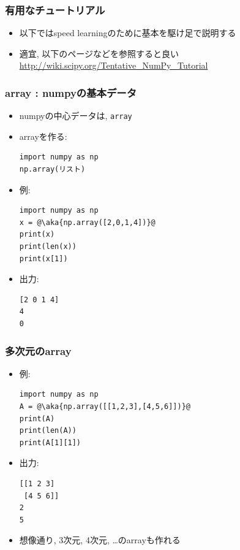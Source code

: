 \documentclass[10pt,dvipdfmx]{beamer}
\newcommand{\aka}[1]{{\color{red}#1}}
\begin{document}
\begin{frame}[fragile]
\frametitle{有用なチュートリアル}
\begin{itemize}
\item 以下ではspeed learningのために基本を駆け足で説明する
\item 適宜, 以下のページなどを参照すると良い
\url{http://wiki.scipy.org/Tentative_NumPy_Tutorial}
\end{itemize}

\end{frame}

\begin{frame}[fragile]
\frametitle{array : numpyの基本データ}
\begin{itemize}
\item numpyの中心データは, {\tt array}
\item arrayを作る:
\begin{lstlisting}
import numpy as np
np.array(リスト)
\end{lstlisting}
\item 例:
\begin{lstlisting}
import numpy as np
x = @\aka{np.array([2,0,1,4])}@
print(x)
print(len(x))
print(x[1])
\end{lstlisting}

\item 出力:
\begin{lstlisting}
[2 0 1 4]
4
0
\end{lstlisting}
\end{itemize}
\end{frame}


\begin{frame}[fragile]
\frametitle{多次元のarray}
\begin{itemize}
\item 例:
\begin{lstlisting}
import numpy as np
A = @\aka{np.array([[1,2,3],[4,5,6]])}@
print(A)
print(len(A))
print(A[1][1])
\end{lstlisting}

\item 出力:
\begin{lstlisting}
[[1 2 3]
 [4 5 6]]
2
5
\end{lstlisting}

\item 想像通り, 3次元, 4次元, \ldots のarrayも作れる
\end{itemize}
\end{frame}
\end{document}
